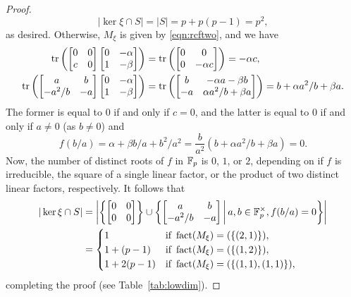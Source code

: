 \begin{proof}
\begin{equation*}
|\ker\xi\cap S|=|S|=p+p(p-1)=p^2,
\end{equation*}
as desired. Otherwise, $M_\xi$ is given by \eqref{eqn:rcftwo}, and we have
\begin{equation}
\label{eqn:linrels}
\begin{split}
\operatorname{tr}\left(
\begin{bmatrix}
0&0\\
c&0
\end{bmatrix}
\begin{bmatrix}
0&-\alpha\\
1&-\beta
\end{bmatrix}\right)
&=
\operatorname{tr}\left(
\begin{bmatrix}
0&0\\
0&-\alpha c
\end{bmatrix}\right)
=-\alpha c,\\
\operatorname{tr}\left(
\begin{bmatrix}
a&b\\
-a^2/b&-a
\end{bmatrix}
\begin{bmatrix}
0&-\alpha\\
1&-\beta
\end{bmatrix}\right)
&=
\operatorname{tr}\left(
\begin{bmatrix}
b&-\alpha a-\beta b\\
-a&\alpha a^2/b+\beta a
\end{bmatrix}\right)
=b+\alpha a^2/b+\beta a.
\end{split}
\end{equation}
The former is equal to $0$ if and only if $c=0$, and the latter is equal to $0$ if and only if $a\ne 0$ (as $b\ne 0$) and
\begin{equation*}
f(b/a)=\alpha+\beta b/a+b^2/a^2=\frac{b}{a^2}(b+\alpha a^2/b+\beta a)=0.
\end{equation*}
Now, the number of distinct roots of $f$ in $\mathbb{F}_p$ is $0$, $1$, or $2$, depending on if $f$ is irreducible, the square of a single linear factor, or the product of two distinct linear factors, respectively. It follows that
\begin{align*}
|\ker\xi\cap S|&=\left|\left\{\begin{bmatrix}
0&0\\
0&0
\end{bmatrix}\right\}\cup
\left\{\begin{bmatrix}
a&b\\
-a^2/b&-a
\end{bmatrix}
\,\middle|\, a,b\in\mathbb{F}_p^\times, f(b/a)=0\right\}\right|\\
&=\begin{cases}
1&\text{if }\operatorname{fact}(M_\xi)=(\{(2,1)\}),\\
1+(p-1)&\text{if }\operatorname{fact}(M_\xi)=(\{(1,2)\}),\\
1+2(p-1)&\text{if }\operatorname{fact}(M_\xi)=(\{(1,1),(1,1)\}),
\end{cases}
\end{align*}
completing the proof (see Table~\ref{tab:lowdim}).
\end{proof}
